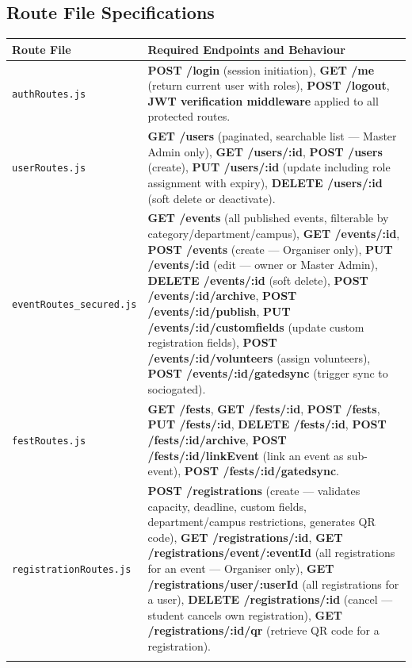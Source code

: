\documentclass[12pt,a4paper]{article}
\begin{document}
\subsection{Route File Specifications}

\begin{longtable}{L{5cm} X}
\toprule
{}
\textbf{Route File} & \textbf{Required Endpoints and Behaviour} \\
\midrule
\endhead
\texttt{authRoutes.js} & \textbf{POST /login} (session initiation), \textbf{GET /me} (return current user with roles), \textbf{POST /logout}, \textbf{JWT verification middleware} applied to all protected routes. \\
\addlinespace
\texttt{userRoutes.js} & \textbf{GET /users} (paginated, searchable list — Master Admin only), \textbf{GET /users/:id}, \textbf{POST /users} (create), \textbf{PUT /users/:id} (update including role assignment with expiry), \textbf{DELETE /users/:id} (soft delete or deactivate). \\
\addlinespace
\texttt{eventRoutes\_secured.js} & \textbf{GET /events} (all published events, filterable by category/department/campus), \textbf{GET /events/:id}, \textbf{POST /events} (create — Organiser only), \textbf{PUT /events/:id} (edit — owner or Master Admin), \textbf{DELETE /events/:id} (soft delete), \textbf{POST /events/:id/archive}, \textbf{POST /events/:id/publish}, \textbf{PUT /events/:id/customfields} (update custom registration fields), \textbf{POST /events/:id/volunteers} (assign volunteers), \textbf{POST /events/:id/gatedsync} (trigger sync to sociogated). \\
\addlinespace
\texttt{festRoutes.js} & \textbf{GET /fests}, \textbf{GET /fests/:id}, \textbf{POST /fests}, \textbf{PUT /fests/:id}, \textbf{DELETE /fests/:id}, \textbf{POST /fests/:id/archive}, \textbf{POST /fests/:id/linkEvent} (link an event as sub-event), \textbf{POST /fests/:id/gatedsync}. \\
\addlinespace
\texttt{registrationRoutes.js} & \textbf{POST /registrations} (create — validates capacity, deadline, custom fields, department/campus restrictions, generates QR code), \textbf{GET /registrations/:id}, \textbf{GET /registrations/event/:eventId} (all registrations for an event — Organiser only), \textbf{GET /registrations/user/:userId} (all registrations for a user), \textbf{DELETE /registrations/:id} (cancel — student cancels own registration), \textbf{GET /registrations/:id/qr} (retrieve QR code for a registration). \\
\addlinespace

\end{longtable}
\end{document}
